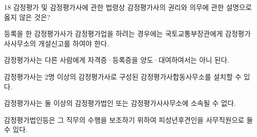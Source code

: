 \begin{question}{18}
감정평가 및 감정평가사에 관한 법령상 감정평가사의 권리와 의무에 관한 설명으로 옳지 않은 것은?
\begin{choices}
  \item 등록을 한 감정평가사가 감정평가업을 하려는 경우에는 국토교통부장관에게 감정평가사사무소의 개설신고를 하여야 한다.
  \item 감정평가사는 다른 사람에게 자격증·등록증을 양도·대여하여서는 아니 된다.
  \item 감정평가사는 2명 이상의 감정평가사로 구성된 감정평가사합동사무소를 설치할 수 있다.
  \item 감정평가사는 둘 이상의 감정평가법인 또는 감정평가사사무소에 소속될 수 없다.
  \item 감정평가법인등은 그 직무의 수행을 보조하기 위하여 피성년후견인을 사무직원으로 둘 수 있다.
\end{choices}
\end{question}
